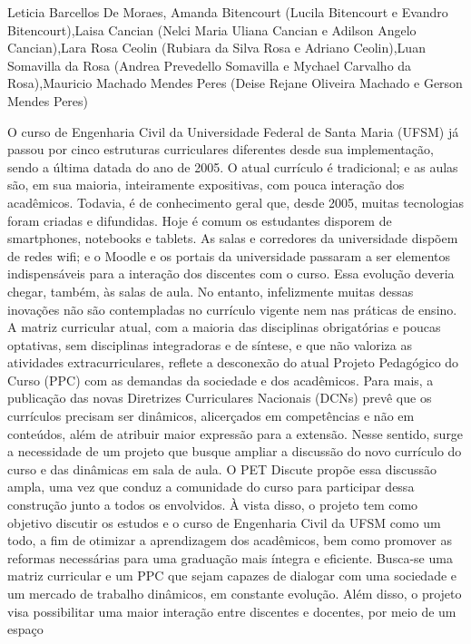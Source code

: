Leticia Barcellos De Moraes, Amanda Bitencourt (Lucila Bitencourt e Evandro Bitencourt),Laisa Cancian (Nelci Maria Uliana Cancian e Adilson Angelo Cancian),Lara Rosa Ceolin (Rubiara da Silva Rosa e Adriano Ceolin),Luan Somavilla da Rosa (Andrea Prevedello Somavilla e Mychael Carvalho da Rosa),Mauricio Machado Mendes Peres (Deise Rejane Oliveira Machado e Gerson Mendes Peres)

O curso de Engenharia Civil da Universidade Federal de Santa Maria (UFSM) já passou por cinco 
estruturas curriculares diferentes desde sua implementação, sendo a última datada do ano de 2005. 
O atual currículo é tradicional; e as aulas são, em sua maioria, inteiramente expositivas, com pouca 
interação dos acadêmicos. Todavia, é de conhecimento geral que, desde 2005, muitas tecnologias 
foram criadas e difundidas. Hoje é comum os estudantes disporem de smartphones, notebooks e 
tablets. As salas e corredores da universidade dispõem de redes wifi; e o Moodle e os portais da 
universidade passaram a ser elementos indispensáveis para a interação dos discentes com o curso. 
Essa evolução deveria chegar, também, às salas de aula. No entanto, infelizmente muitas dessas 
inovações não são contempladas no currículo vigente nem nas práticas de ensino. A matriz 
curricular atual, com a maioria das disciplinas obrigatórias e poucas optativas, sem disciplinas 
integradoras e de síntese, e que não valoriza as atividades extracurriculares, reflete a desconexão 
do atual Projeto Pedagógico do Curso (PPC) com as demandas da sociedade e dos acadêmicos. 
Para mais, a publicação das novas Diretrizes Curriculares Nacionais (DCNs) prevê que os 
currículos precisam ser dinâmicos, alicerçados em competências e não em conteúdos, além de 
atribuir maior expressão para a extensão. Nesse sentido, surge a necessidade de um projeto que 
busque ampliar a discussão do novo currículo do curso e das dinâmicas em sala de aula. O PET 
Discute propõe essa discussão ampla, uma vez que conduz a comunidade do curso para participar 
dessa construção junto a todos os envolvidos. À vista disso, o projeto tem como objetivo discutir 
os estudos e o curso de Engenharia Civil da UFSM como um todo, a fim de otimizar a 
aprendizagem dos acadêmicos, bem como promover as reformas necessárias para uma graduação 
mais íntegra e eficiente. Busca-se uma matriz curricular e um PPC que sejam capazes de dialogar 
com uma sociedade e um mercado de trabalho dinâmicos, em constante evolução. Além disso, o 
projeto visa possibilitar uma maior interação entre discentes e docentes, por meio de um espaço 
